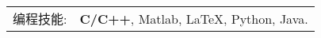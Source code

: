 %
%


 
\renewcommand{\arraystretch}{1.1}

	\begin{tabular}{>{}r>{}p{13cm}} 
		\textsc{编程技能:}      &  \textbf{C/C++}, Matlab, \LaTeX, Python, Java.\\  
	\end{tabular}
	
